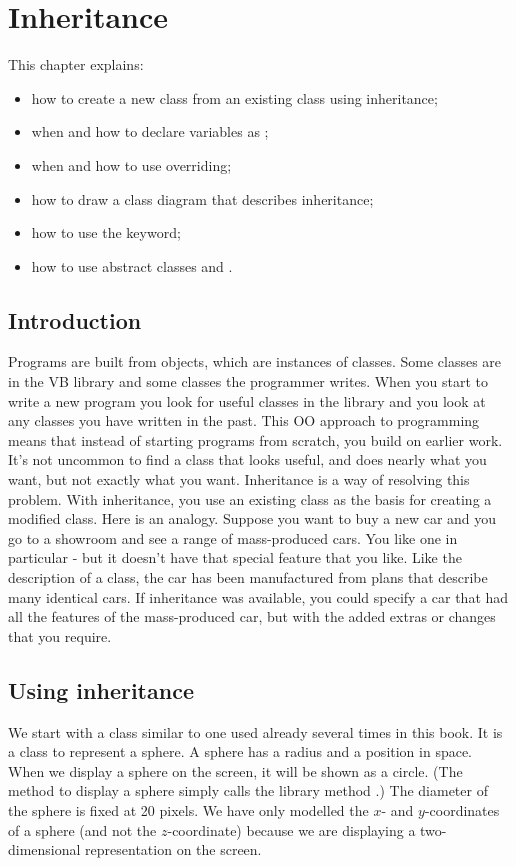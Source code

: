 \chapter{Inheritance}
	\label{ch:inheritance}

	This chapter explains:
	\begin{itemize}
  	\item how to create a new class from an existing class using inheritance;
    \item when and how to declare variables as ;
    \item when and how to use overriding;
    \item how to draw a class diagram that describes inheritance;
    \item how to use the  keyword;
    \item how to use abstract classes and .
	\end{itemize}

	
  \section{Introduction}
		Programs are built from objects, which are instances of classes. Some classes are in the VB library and some classes the programmer writes. When you start to write a new program you look for useful classes in the library and you look at any classes you have written in the past. This OO approach to programming means that instead of starting programs from scratch, you build on earlier work. It's not uncommon to find a class that looks useful, and does nearly what you want, but not exactly what you want. Inheritance is a way of resolving this problem. With inheritance, you use an existing class as the basis for creating a modified class.
Here is an analogy. Suppose you want to buy a new car and you go to a showroom and see a range of mass-produced cars. You like one in particular - but it doesn't have that special feature that you like. Like the description of a class, the car has been manufactured from plans that describe many identical cars. If inheritance was available, you could specify a car that had all the features of the mass-produced car, but with the added extras or changes that you require.


	\section{Using inheritance}
		We start with a class similar to one used already several times in this book. It is a class to represent a sphere. A sphere has a radius and a position in space. When we display a sphere on the screen, it will be shown as a circle. (The method to display a sphere simply calls the library method .) The diameter of the sphere is fixed at 20 pixels. We have only modelled the $x$- and $y$-coordinates of a sphere (and not the $z$-coordinate) because we are displaying a two-dimensional representation on the screen.
		
